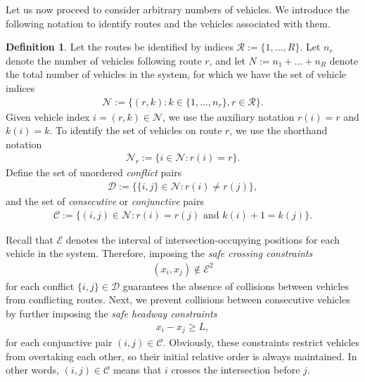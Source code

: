 \documentclass{report}
\theoremstyle{definition}
\newtheorem{define}{Definition}[chapter]
\theoremstyle{plain}
\begin{document}
Let us now proceed to consider arbitrary numbers of vehicles. We introduce
the following notation to identify routes and the vehicles associated with them.

\begin{define}
Let the routes be identified by indices $\mathcal{R} := \{1, \dots, R\}$. Let
$n_{r}$ denote the number of vehicles following route $r$, and let
$N := n_1 + \dots + n_R$ denote the total number of vehicles in the system, for
which we have the set of vehicle indices
\begin{align}
  \mathcal{N} := \{ (r, k) : k \in \{1, \dots, n_{r}\}, r \in \mathcal{R}\} .
\end{align}
Given vehicle index $i = (r, k) \in \mathcal{N}$, we use
the auxiliary notation $r(i) = r$ and $k(i) = k$.
%
To identify the set of vehicles on route $r$, we use the shorthand notation
\begin{align}
  \mathcal{N}_{r} := \{ i \in \mathcal{N} : r(i) = r \} .
\end{align}
Define the set of unordered \emph{conflict} pairs
\begin{align}
  \mathcal{D} := \{ \{i,j\} \in \mathcal{N} : r(i) \neq r(j) \} ,
\end{align}
and the set of \emph{consecutive} or \emph{conjunctive} pairs
\begin{align}
  \mathcal{C} := \{ (i,j) \in \mathcal{N} : r(i) = r(j) \text{ and } k(i) + 1 = k(j) \} .
\end{align}
\end{define}

\pagebreak[3]
Recall that $\mathcal{E}$ denotes the interval of intersection-occupying
positions for each vehicle in the system. Therefore, imposing the \emph{safe
  crossing constraints}
\begin{align}\label{eq:safe-crossing}
  (x_{i}, x_{j}) \notin \mathcal{E}^{2} 
\end{align}
for each conflict $\{i,j\} \in \mathcal{D}$ guarantees the absence of
collisions between vehicles from conflicting routes.
Next, we prevent collisions between consecutive vehicles by further imposing
the \textit{safe headway constraints}
\begin{align}
  \label{eq:follow_constraints}
  x_{i} - x_{j} \geq L ,
\end{align}
for each conjunctive pair $(i, j) \in \mathcal{C}$. Obviously, these constraints
restrict vehicles from overtaking each other, so their initial relative order is
always maintained. In other words, $(i,j) \in \mathcal{C}$ means that $i$ crosses
the intersection before $j$.
\end{document}
